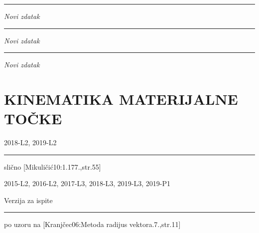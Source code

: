 \documentclass[10pt]{book}
\newcounter{zadatak} %
\newcounter{cjelina}
\begin{document}
{\color{boja} \rule{\linewidth}{0.3mm} }
 \textit{Novi zdatak}


\vspace{0.2cm}



\vspace{0.2cm} 


{\color{boja} \rule{\linewidth}{0.3mm} }

\textit{Novi zdatak}

\vspace{0.2cm}



\vspace{0.2cm} 


{\color{boja} \rule{\linewidth}{0.3mm} }

\textit{Novi zdatak}

\vspace{0.2cm}



\vspace{0.2cm} 


\newpage
\chapter{KINEMATIKA MATERIJALNE TOČKE}
\setcounter{zadatak}{0}



2018-L2, 2019-L2

\vspace{0.2cm}

{\color{boja} \rule{\linewidth}{0.3mm} }


 slično [Mikuličić10:1.177.,str.55]

2015-L2, 2016-L2, 2017-L3, 2018-L3, 2019-L3, 2019-P1


Verzija za ispite

\vspace{0.2cm}

{\color{boja} \rule{\linewidth}{0.3mm} }


 po uzoru na [Kranjčec06:Metoda radijus vektora.7.,str.11]
\end{document}
